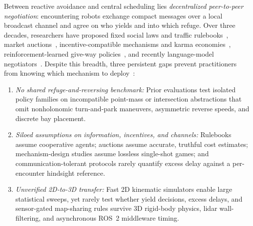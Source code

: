 \documentclass[letterpaper,journal]{IEEEtran}
\begin{document}
Between reactive avoidance and central scheduling lies \emph{decentralized peer-to-peer negotiation}: encountering robots exchange compact messages over a local broadcast channel and agree on who yields and into which refuge. Over three decades, researchers have proposed fixed social laws and traffic rulebooks~\cite{kato1992coordinating,shoham1995social}, market auctions~\cite{gerkey2002sold,gautier2022negotiated}, incentive-compatible mechanisms and karma economies~\cite{clarke1971multipart,censi2019karma,elokda2024karma}, reinforcement-learned give-way policies~\cite{bettini2022vmas,bettini2023heterogeneous,park2023hallucination}, and recently language-model negotiators~\cite{marlin2024,gamechat2025,garg2024llm}. Despite this breadth, three persistent gaps prevent practitioners from knowing which mechanism to deploy~\cite{chandra2026social,francis2025principles}:
\begin{enumerate}
\item \emph{No shared refuge-and-reversing benchmark:} Prior evaluations test isolated policy families on incompatible point-mass or intersection abstractions that omit nonholonomic turn-and-park maneuvers, asymmetric reverse speeds, and discrete bay placement.
\item \emph{Siloed assumptions on information, incentives, and channels:} Rulebooks assume cooperative agents; auctions assume accurate, truthful cost estimates; mechanism-design studies assume lossless single-shot games; and communication-tolerant protocols rarely quantify excess delay against a per-encounter hindsight reference.
\item \emph{Unverified 2D-to-3D transfer:} Fast 2D kinematic simulators enable large statistical sweeps, yet rarely test whether yield decisions, excess delays, and sensor-gated map-sharing rules survive 3D rigid-body physics, lidar wall-filtering, and asynchronous ROS~2 middleware timing.
\end{enumerate}
\end{document}
